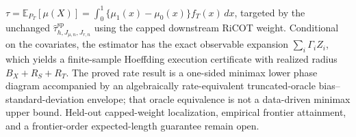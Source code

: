 \(\tau=\mathbb E_{P_T}[\mu(X)]=\int_0^1\{\mu_1(x)-\mu_0(x)\}f_T(x)\,dx\), targeted by the unchanged \(\widehat\tau^{\mathrm{sp}}_{h,J_{\mu,n},J_{r,n}}\) using the capped downstream RiCOT weight. Conditional on the covariates, the estimator has the exact observable expansion \(\sum_i\Gamma_i Z_i\), which yields a finite-sample Hoeffding execution certificate with realized radius \(B_X+R_S+R_T\). The proved rate result is a one-sided minimax lower phase diagram accompanied by an algebraically rate-equivalent truncated-oracle bias--standard-deviation envelope; that oracle equivalence is not a data-driven minimax upper bound. Held-out capped-weight localization, empirical frontier attainment, and a frontier-order expected-length guarantee remain open.